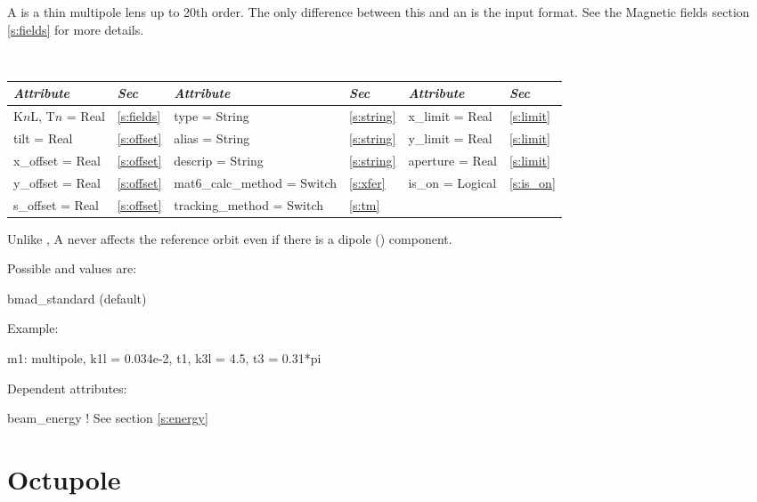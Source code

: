 A  is a thin multipole lens up to 20th order. The only
difference between this and an  is the input format. See the 
Magnetic fields section \ref{s:fields} for more details.

\begin{table}[h]
\centering 
{\tt
\begin{tabular}{|l|l||l|l||l|l|} \hline
  {\sl Attribute} & {\sl Sec}  & {\sl Attribute} & {\sl Sec} & {\sl Attribute} & {\sl Sec} \\ \hline
  K$n$L, T$n$ = Real &  \ref{s:fields} &  type = String                & \ref{s:string} & x\_limit = Real  & \ref{s:limit} \\ \hline
  tilt       = Real  &  \ref{s:offset} &  alias = String               & \ref{s:string} & y\_limit = Real  & \ref{s:limit} \\ \hline
  x\_offset  = Real  &  \ref{s:offset} &  descrip = String             & \ref{s:string} & aperture = Real  & \ref{s:limit} \\ \hline
  y\_offset  = Real  &  \ref{s:offset} &  mat6\_calc\_method = Switch  & \ref{s:xfer}   & is\_on = Logical & \ref{s:is_on} \\ \hline
  s\_offset  = Real  &  \ref{s:offset} &  tracking\_method = Switch    & \ref{s:tm}     &                  &               \\ \hline
\end{tabular}
}
\end{table}

Unlike \mad, A  never affects the reference orbit
even if there is a dipole () component.

\noindent
Possible  and  values are:
\vskip 0.01in
\begin{example}
   bmad\_standard  (default) 
\end{example}

\vskip0.2in \noindent
Example:
\begin{example}
  m1: multipole, k1l = 0.034e-2, t1, k3l = 4.5, t3 = 0.31*pi
\end{example}

\vskip0.1in \noindent
Dependent attributes:
\begin{example}
  beam\_energy  ! See section \ref{s:energy}
\end{example}


\section{Octupole}
\label{s:oct}


